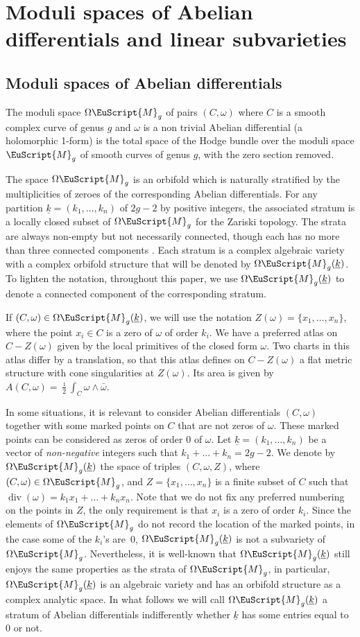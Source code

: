 \documentclass[JEP,XML,SOM,Unicode]{cedram}
\let\mathcal\EuScript
\DeclareMathOperator{\Div}{div}
\theoremstyle{plain}
\theoremstyle{definition}
\newcommand{\Mcal}{\mathcal{M}}
\newcommand{\cM}{\mathcal{M}}
\let\omg\omega
\let\ul\underline
\newcommand{\trate}{\Omega\Mcal_{g}(\ul{k})}
\newcommand{\htrate}{\Omega\Mcal_{g}}
\begin{document}
\section{Moduli spaces of Abelian differentials and linear subvarieties}\label{sec:strate:n:lin:subvar}
\subsection{Moduli spaces of Abelian differentials}\label{subsec:strate:abel}
The moduli space $\htrate$ of pairs $(C, \omega)$ where $C$ is a smooth complex curve of genus $g$ and $\omega$ is a non trivial Abelian differential (\ie a holomorphic 1-form) is the total space of the Hodge bundle over the moduli space $\cM_g$ of smooth curves of genus $g$, with the zero section removed.

The space $\htrate$ is an orbifold which is naturally stratified by the multiplicities of zeroes of the corresponding Abelian differentials. For any partition $\underline k=(k_1,\dots,k_n)$ of $ 2g - 2$ by positive integers, the associated stratum is a locally closed subset of $\htrate$ for the Zariski topology. The strata are always non-empty but not necessarily connected, though each has no more than three connected components \cite{KZ03}. Each stratum is a complex algebraic variety with a complex orbifold structure that will be denoted by $\trate$. To lighten the notation, throughout this paper, we use $\trate$ to denote a connected component of the corresponding stratum.

If $(C,\omega)\in\trate$, we will use the notation $Z(\omega)=\{x_1,\dots,x_n\}$, where the point $x_i\in C$ is a zero of $\omega$ of order $k_i$. We have a preferred atlas on $C - Z(\omega)$ given by the local primitives of the closed form $\omega$. Two charts in this atlas differ by a translation, so that this atlas defines on $C - Z(\omega)$ a flat metric structure with cone singularities at $Z(\omega)$. Its area is given by $A(C, \omega) = \frac{\imath}{2} \int_C \omega \wedge \bar \omega$.

In some situations, it is relevant to consider Abelian differentials $(C,\omg)$ together with some marked points on $C$ that are not zeros of $\omg$. These marked points can be considered as zeros of order $0$ of $\omg$. Let $\ul{k}=(k_1,\dots,k_n)$ be a vector of \emph{non-negative} integers such that $k_1+\dots+k_n=2g-2$. We denote by $\trate$ the space of triples $(C,\omg,Z)$, where $(C,\omg)\in \htrate$, and $Z=\{x_1,\dots,x_n\}$ is a finite subset of $C$ such that $\Div(\omg)=k_1x_1+\dots+k_nx_n$. Note that we do not fix any preferred numbering on the points in $Z$, the only requirement is that $x_i$ is a zero of order $k_i$.
Since the elements of $\htrate$ do not record the location of the marked points, in the case some of the $k_i$'s are~$0$, $\trate$ is not a subvariety of $\htrate$.
Nevertheless, it is well-known that $\trate$ still enjoys the same properties as the strata of $\htrate$, in particular, $\trate$ is an algebraic variety and has an orbifold structure as a complex analytic space.
In what follows we will call $\trate$ a stratum of Abelian differentials indifferently whether $\ul{k}$ has some entries equal to $0$ or not.\enlargethispage{.5\baselineskip}%
\end{document}
